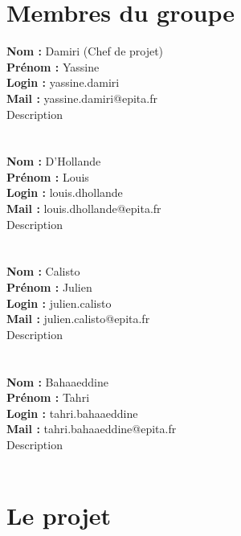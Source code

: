 \documentclass[12pt]{report}
\title{\HUGE{Cahier des charges}}
\author{- \textbf{\textit{\textwidth{Torideani}}} - 
\\ \textit{by} \\ \textit{The Smashing IT} \\ \begin{center}\texttt{[image: logo.png]} \end{center}  \\ 
\\ Yassine Damiri \\ Louis D'Hollande \\ Julien Calisto \\
 Tahri Bahaaeddine }
\date{Vendredi 17 Janvier 2020 }
\begin{document}
\maketitle


\tableofcontents

\chapter{Membres du groupe}
\noindent
\textbf{Nom :} Damiri (Chef de projet)\\
\textbf{Prénom :} Yassine\\
\textbf{Login :} yassine.damiri\\
\textbf{Mail :} yassine.damiri@epita.fr\\
Description \\ \\ \\
\textbf{Nom :} D'Hollande\\
\textbf{Prénom :} Louis\\
\textbf{Login :} louis.dhollande\\
\textbf{Mail :} louis.dhollande@epita.fr\\
Description \\ \\ \\
\textbf{Nom :} Calisto\\
\textbf{Prénom :} Julien\\
\textbf{Login :} julien.calisto\\
\textbf{Mail :} julien.calisto@epita.fr\\
Description \\ \\ \\
\textbf{Nom :} Bahaaeddine\\
\textbf{Prénom :} Tahri\\
\textbf{Login :} tahri.bahaaeddine\\
\textbf{Mail :} tahri.bahaaeddine@epita.fr\\
Description \\ \\




\chapter{Le projet}
\end{document}
